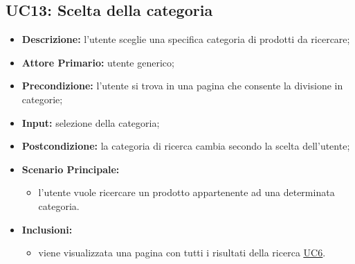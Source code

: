 \subsection{UC13: Scelta della categoria}
\label{sec:UC13}
\begin{itemize}
    \item \textbf{Descrizione:} l'utente sceglie una specifica categoria di prodotti da ricercare;
    \item \textbf{Attore Primario:} utente generico;
    \item \textbf{Precondizione:} l'utente si trova in una pagina che consente la divisione in categorie;
    \item \textbf{Input:} selezione della categoria;
    \item \textbf{Postcondizione:} la categoria di ricerca cambia secondo la scelta dell'utente;
    \item \textbf{Scenario Principale:}
    \begin{itemize}
        \item l'utente vuole ricercare un prodotto appartenente ad una determinata categoria.
    \end{itemize} 
    \item \textbf{Inclusioni:}
    \begin{itemize}
        \item viene visualizzata una pagina con tutti i risultati della ricerca \hyperref[sec:UC6]{\underline{UC6}}.
    \end{itemize}
\end{itemize}